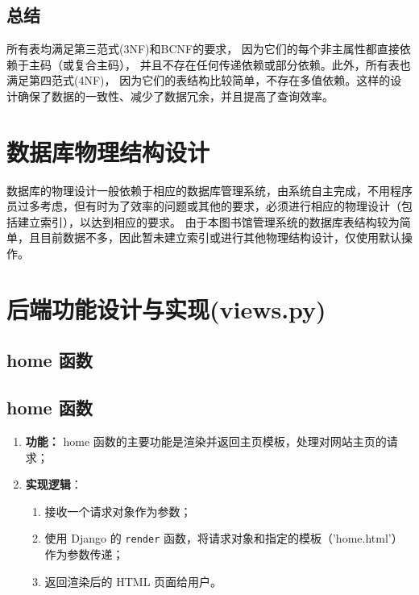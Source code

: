 \documentclass{ctexart}
\begin{document}
\subsection{总结}
所有表均满足第三范式(3NF)和BCNF的要求，
因为它们的每个非主属性都直接依赖于主码（或复合主码），
并且不存在任何传递依赖或部分依赖。此外，所有表也满足第四范式(4NF)，
因为它们的表结构比较简单，不存在多值依赖。这样的设计确保了数据的一致性、减少了数据冗余，并且提高了查询效率。
	\section{数据库物理结构设计}
	数据库的物理设计一般依赖于相应的数据库管理系统，由系统自主完成，不用程序员过多考虑，但有时为了效率的问题或其他的要求，必须进行相应的物理设计（包括建立索引），以达到相应的要求。
	由于本图书馆管理系统的数据库表结构较为简单，且目前数据不多，因此暂未建立索引或进行其他物理结构设计，仅使用默认操作。


                            
	\section{后端功能设计与实现(views.py)}
	\subsection{home 函数}
	\subsection{home 函数}
	\begin{enumerate}
        \item \textbf{功能：} home 函数的主要功能是渲染并返回主页模板，处理对网站主页的请求；
        \item \textbf{实现逻辑}：
        \begin{enumerate}
            \item 接收一个请求对象作为参数；
            \item 使用 Django 的 \texttt{render} 函数，将请求对象和指定的模板（'home.html'）作为参数传递；
            \item 返回渲染后的 HTML 页面给用户。
        \end{enumerate}
    \end{enumerate}
    
\end{document}
